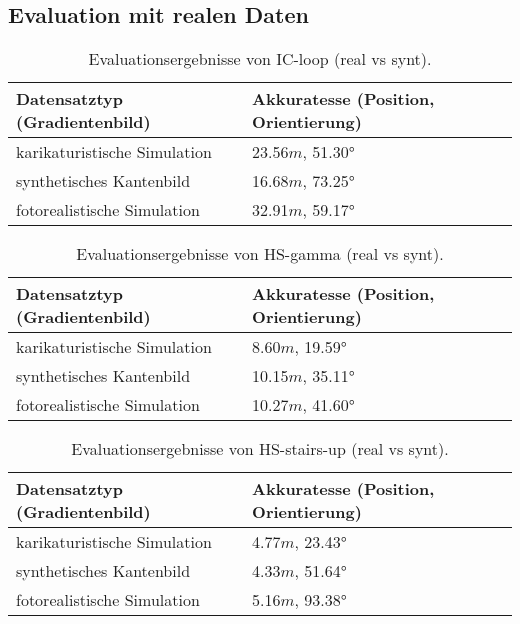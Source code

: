 \cleardoublepage
\subsection{Evaluation mit realen Daten}


\begin{table}
	\centering
	\caption{Evaluationsergebnisse von IC-loop (real vs synt).}
	\begin{tabularx}{0.75\textwidth}{X X}\textbf{Datensatztyp} \hspace{2cm} (Gradientenbild)& \textbf{Akkuratesse} \hspace{2cm} (Position, Orientierung)\\
		\hline
		karikaturistische Simulation & 23.56$m$, 51.30°\\
		\hline
		synthetisches Kantenbild & 16.68$m$, 73.25°\\
		\hline
		fotorealistische Simulation & 32.91$m$, 59.17°\\
	\end{tabularx}
	\label{tab:synth_icloop}
\end{table}


\begin{table}
	\centering
	\caption{Evaluationsergebnisse von HS-gamma (real vs synt).}
	\begin{tabularx}{0.75\textwidth}{X X}\textbf{Datensatztyp} \hspace{2cm} (Gradientenbild)& \textbf{Akkuratesse} \hspace{2cm} (Position, Orientierung)\\
		\hline
		karikaturistische Simulation & 8.60$m$, 19.59°\\
		\hline
		synthetisches Kantenbild & 10.15$m$, 35.11°\\
		\hline
		fotorealistische Simulation & 10.27$m$, 41.60°\\
	\end{tabularx}
	\label{tab:synth_hs_gamma}
\end{table}


\begin{table}
	\centering
	\caption{Evaluationsergebnisse von HS-stairs-up (real vs synt).}
	\begin{tabularx}{0.75\textwidth}{X X}\textbf{Datensatztyp} \hspace{2cm} (Gradientenbild)& \textbf{Akkuratesse} \hspace{2cm} (Position, Orientierung)\\
		\hline
		karikaturistische Simulation & 4.77$m$, 23.43°\\
		\hline
		synthetisches Kantenbild & 4.33$m$, 51.64°\\
		\hline
		fotorealistische Simulation & 5.16$m$, 93.38°\\
	\end{tabularx}
	\label{tab:synth_hs_stairs_up}
\end{table}



